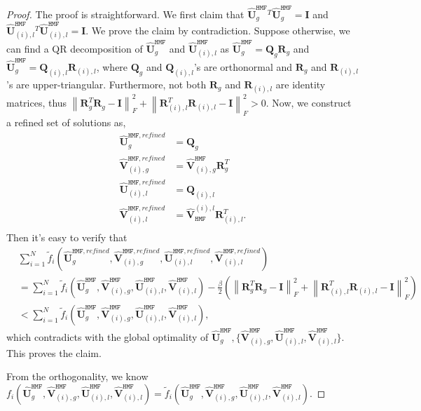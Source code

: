 \documentclass[10pt,a4paper]{amsart}
\newcommand{\hmatU}{\hat{\mathbf{U}}}
\newcommand{\hmatV}{\hat{\mathbf{V}}}
\def\hmf{\texttt{HMF}\xspace}
\newcommand{\matI}{\mathbf{I}}
\newcommand{\matQ}{\mathbf{Q}}
\newcommand{\matR}{\mathbf{R}}
\newcommand{\norm}[1]{\left\lVert#1\right\rVert}
\newcommand{\tf}{\tilde{f}}
\begin{document}
\begin{proof}
The proof is straightforward. We first claim that $\hmatU_g^{\hmf}{}^T\hmatU_g^{\hmf}=\matI$ and $\hmatU^{\hmf}_{(i),l}{}^T\hmatU^{\hmf}_{(i),l}=\matI$. We prove the claim by contradiction. Suppose otherwise, we can find a QR decomposition of $\hmatU_g^{\hmf}$ and $\hmatU^{\hmf}_{(i),l}$ as $\hmatU_g^{\hmf} = \matQ_g\matR_g$ and $\hmatU_g^{\hmf} = \matQ_{(i),l}\matR_{(i),l}$, where $\matQ_g$ and $\matQ_{(i),l}$'s are orthonormal and $\matR_g$ and $\matR_{(i),l}$'s are upper-triangular. Furthermore, not both $\matR_g$ and $\matR_{(i),l}$ are identity matrices, thus $\norm{\matR_g^T\matR_g-\matI}_F^2+ \norm{\matR_{(i),l}^T\matR_{(i),l}-\matI}_F^2> 0$. Now, we construct a refined set of solutions as,
\begin{equation*}
\begin{aligned}
\hmatU_g^{\hmf, refined} &= \matQ_g\\
\hmatV^{\hmf, refined}_{(i),g} &= \hmatV_{(i),g}^{\hmf} \matR_g^{T}\\
\hmatU^{\hmf, refined}_{(i),l} &= \matQ_{(i),l}\\
\hmatV^{\hmf, refined}_{(i),l} &= \hmatV^{(i),l}_{\hmf} \matR_{(i),l}^{T}.\\
\end{aligned}
\end{equation*}
Then it's easy to verify that
$$
\begin{aligned}
&\sum_{i=1}^N\tf_i\left(\hmatU^{\hmf, refined}_g,\hmatV^{\hmf, refined}_{(i),g},\hmatU^{\hmf, refined}_{(i),l},\hmatV^{\hmf, refined}_{(i),l}\right)\\
&= \sum_{i=1}^N\tf_i\left(\hmatU^{\hmf}_g,\hmatV_{(i),g}^{\hmf},\hmatU^{\hmf}_{(i),l},\hmatV^{\hmf}_{(i),l}\right) - \frac{\beta}{2}\left(\norm{\matR_g^T\matR_g-\matI}_F^2+ \norm{\matR_{(i),l}^T\matR_{(i),l}-\matI}_F^2\right)\\
&< \sum_{i=1}^N\tf_i\left(\hmatU^{\hmf}_g,\hmatV_{(i),g}^{\hmf},\hmatU^{\hmf}_{(i),l},\hmatV^{\hmf}_{(i),l}\right),
\end{aligned}
$$
which contradicts with the global optimality of $\hmatU_g^{\hmf},\{\hmatV^{\hmf}_{(i),g},\hmatU^{\hmf}_{(i),l},\hmatV^{\hmf}_{(i),l}\}$. This proves the claim.

From the orthogonality, we know $f_i\left(\hmatU^{\hmf}_g,\hmatV_{(i),g}^{\hmf},\hmatU^{\hmf}_{(i),l},\hmatV^{\hmf}_{(i),l}\right) = \tf_i\left(\hmatU^{\hmf}_g,\hmatV_{(i),g}^{\hmf},\hmatU^{\hmf}_{(i),l},\hmatV^{\hmf}_{(i),l}\right)$.


\end{proof}
\end{document}
